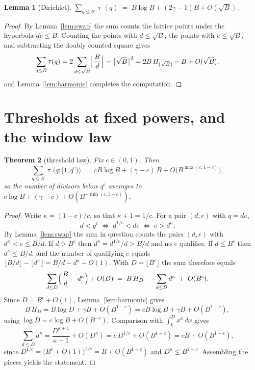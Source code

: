 \documentclass[11pt]{amsart}
\newtheorem{theorem}{Theorem}
\newtheorem{lemma}[theorem]{Lemma}
\theoremstyle{remark}
\newcommand{\eul}{\gamma}
\DeclareMathOperator{\divc}{\tau}
\begin{document}
\begin{lemma}[Dirichlet]\label{lem:dirichlet}
$\displaystyle\sum_{q\le B}\divc(q)\;=\;B\log B+(2\eul-1)B+O(\sqrt B)$.
\end{lemma}

\begin{proof}
By Lemma~\ref{lem:swap} the sum counts the lattice points under the
hyperbola $de\le B$.  Counting the points with $d\le\sqrt B$, the points
with $e\le\sqrt B$, and subtracting the doubly counted square gives
\[
\sum_{q\le B}\divc(q)
=2\sum_{d\le\sqrt B}\Bigl\lfloor\frac{B}{d}\Bigr\rfloor
-\bigl\lfloor\sqrt B\bigr\rfloor^{2}
=2B\,H_{\lfloor\sqrt B\rfloor}-B+O(\sqrt B),
\]
and Lemma~\ref{lem:harmonic} completes the computation.
\end{proof}

\section{Thresholds at fixed powers, and the window law}
\label{sec:threshold}

\begin{theorem}[threshold law]\label{thm:threshold}
Fix $c\in(0,1)$.  Then
\[
\sum_{q\le B}\divc\bigl(q;[1,q^{c})\bigr)
\;=\;cB\log B+(\eul-c)\,B+O\bigl(B^{\max(c,1-c)}\bigr),
\]
so the number of divisors below $q^{c}$ averages to
$c\log B+(\eul-c)+O(B^{-\min(c,1-c)})$.
\end{theorem}

\begin{proof}
Write $\kappa=(1-c)/c$, so that $\kappa+1=1/c$.  For a pair $(d,e)$ with
$q=de$,
\[
d<q^{c}
\;\iff\; d^{1/c}<de
\;\iff\; e>d^{\kappa}.
\]
By Lemma~\ref{lem:swap} the sum in question counts the pairs $(d,e)$
with $d^{\kappa}<e\le B/d$.  If $d>B^{c}$ then
$d^{\kappa}=d^{1/c}/d>B/d$ and no $e$ qualifies.  If $d\le B^{c}$ then
$d^{\kappa}\le B/d$, and the number of qualifying $e$ equals
$\lfloor B/d\rfloor-\lfloor d^{\kappa}\rfloor=B/d-d^{\kappa}+O(1)$.
With $D=\lfloor B^{c}\rfloor$ the sum therefore equals
\[
\sum_{d\le D}\Bigl(\frac{B}{d}-d^{\kappa}\Bigr)+O(D)
\;=\;B\,H_{D}\;-\;\sum_{d\le D}d^{\kappa}\;+\;O(B^{c}).
\]
Since $D=B^{c}+O(1)$, Lemma~\ref{lem:harmonic} gives
\[
B\,H_{D}
=B\log D+\eul B+O(B^{1-c})
=cB\log B+\eul B+O(B^{1-c}),
\]
using $\log D=c\log B+O(B^{-c})$.  Comparison with
$\int_{0}^{D}x^{\kappa}\,dx$ gives
\[
\sum_{d\le D}d^{\kappa}
=\frac{D^{\kappa+1}}{\kappa+1}+O(D^{\kappa})
=c\,D^{1/c}+O(B^{1-c})
=cB+O(B^{1-c}),
\]
since $D^{1/c}=\bigl(B^{c}+O(1)\bigr)^{1/c}=B+O(B^{1-c})$ and
$D^{\kappa}\le B^{1-c}$.  Assembling the pieces yields the statement.
\end{proof}
\end{document}
